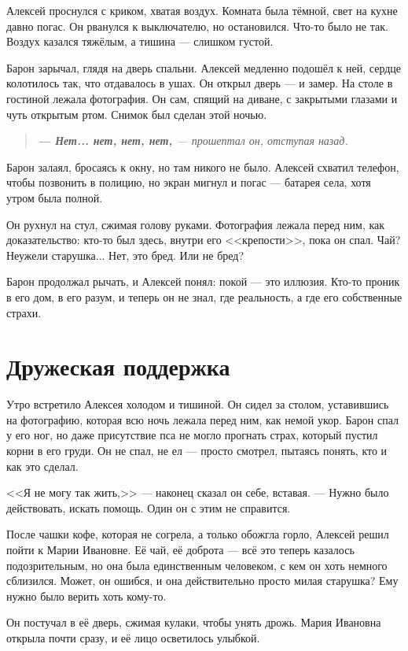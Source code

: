 \documentclass[12pt,a4paper]{book}
\newenvironment{dialogue}{\begin{quote}\itshape}{\end{quote}} %
\begin{document}
Алексей проснулся с криком, хватая воздух. Комната была тёмной, свет на кухне давно погас. Он рванулся к выключателю, но остановился. Что-то было не так. Воздух казался тяжёлым, а тишина --- слишком густой.

Барон зарычал, глядя на дверь спальни. Алексей медленно подошёл к ней, сердце колотилось так, что отдавалось в ушах. Он открыл дверь --- и замер. На столе в гостиной лежала фотография. Он сам, спящий на диване, с закрытыми глазами и чуть открытым ртом. Снимок был сделан этой ночью.

\begin{dialogue}
\textbf{--- Нет... нет, нет, нет,} --- прошептал он, отступая назад.
\end{dialogue}

Барон залаял, бросаясь к окну, но там никого не было. Алексей схватил телефон, чтобы позвонить в полицию, но экран мигнул и погас --- батарея села, хотя утром была полной.

Он рухнул на стул, сжимая голову руками. Фотография лежала перед ним, как доказательство: кто-то был здесь, внутри его <<крепости>>, пока он спал. Чай? Неужели старушка... Нет, это бред. Или не бред?

Барон продолжал рычать, и Алексей понял: покой --- это иллюзия. Кто-то проник в его дом, в его разум, и теперь он не знал, где реальность, а где его собственные страхи.

\chapter{Дружеская поддержка}

Утро встретило Алексея холодом и тишиной. Он сидел за столом, уставившись на фотографию, которая всю ночь лежала перед ним, как немой укор. Барон спал у его ног, но даже присутствие пса не могло прогнать страх, который пустил корни в его груди. Он не спал, не ел --- просто смотрел, пытаясь понять, кто и как это сделал.

<<Я не могу так жить,>> --- наконец сказал он себе, вставая. --- Нужно было действовать, искать помощь. Один он с этим не справится.

После чашки кофе, которая не согрела, а только обожгла горло, Алексей решил пойти к Марии Ивановне. Её чай, её доброта --- всё это теперь казалось подозрительным, но она была единственным человеком, с кем он хоть немного сблизился. Может, он ошибся, и она действительно просто милая старушка? Ему нужно было верить хоть кому-то.

Он постучал в её дверь, сжимая кулаки, чтобы унять дрожь. Мария Ивановна открыла почти сразу, и её лицо осветилось улыбкой.
\end{document}
